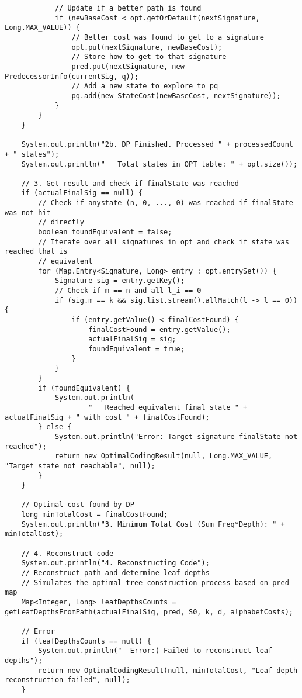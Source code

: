 \documentclass[a4paper,10pt,ngerman]{scrartcl}
\begin{document}
\begin{lstlisting}
            // Update if a better path is found
            if (newBaseCost < opt.getOrDefault(nextSignature, Long.MAX_VALUE)) {
                // Better cost was found to get to a signature
                opt.put(nextSignature, newBaseCost);
                // Store how to get to that signature
                pred.put(nextSignature, new PredecessorInfo(currentSig, q));
                // Add a new state to explore to pq
                pq.add(new StateCost(newBaseCost, nextSignature));
            }
        }
    }

    System.out.println("2b. DP Finished. Processed " + processedCount + " states");
    System.out.println("   Total states in OPT table: " + opt.size());

    // 3. Get result and check if finalState was reached
    if (actualFinalSig == null) {
        // Check if anystate (n, 0, ..., 0) was reached if finalState was not hit
        // directly
        boolean foundEquivalent = false;
        // Iterate over all signatures in opt and check if state was reached that is
        // equivalent
        for (Map.Entry<Signature, Long> entry : opt.entrySet()) {
            Signature sig = entry.getKey();
            // Check if m == n and all l_i == 0
            if (sig.m == k && sig.list.stream().allMatch(l -> l == 0)) {
                if (entry.getValue() < finalCostFound) {
                    finalCostFound = entry.getValue();
                    actualFinalSig = sig;
                    foundEquivalent = true;
                }
            }
        }
        if (foundEquivalent) {
            System.out.println(
                    "   Reached equivalent final state " + actualFinalSig + " with cost " + finalCostFound);
        } else {
            System.out.println("Error: Target signature finalState not reached");
            return new OptimalCodingResult(null, Long.MAX_VALUE, "Target state not reachable", null);
        }
    }

    // Optimal cost found by DP
    long minTotalCost = finalCostFound;
    System.out.println("3. Minimum Total Cost (Sum Freq*Depth): " + minTotalCost);

    // 4. Reconstruct code
    System.out.println("4. Reconstructing Code");
    // Reconstruct path and determine leaf depths
    // Simulates the optimal tree construction process based on pred map
    Map<Integer, Long> leafDepthsCounts = getLeafDepthsFromPath(actualFinalSig, pred, S0, k, d, alphabetCosts);

    // Error
    if (leafDepthsCounts == null) {
        System.out.println("  Error:( Failed to reconstruct leaf depths");
        return new OptimalCodingResult(null, minTotalCost, "Leaf depth reconstruction failed", null);
    }


\end{lstlisting}
\end{document}
